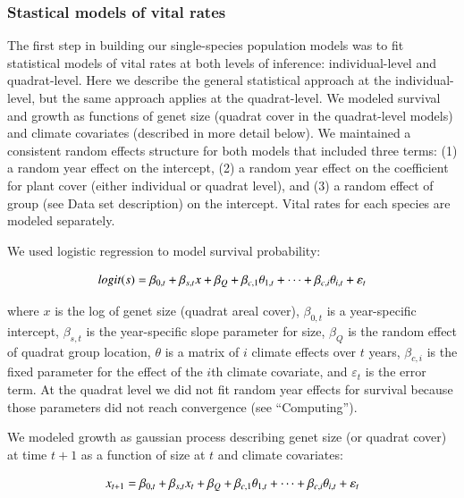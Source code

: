 \documentclass[author-year, 12pt,review]{components/elsarticle} %
\begin{document}
\subsubsection{Stastical models of vital
rates}\label{stastical-models-of-vital-rates}

The first step in building our single-species population models was to
fit statistical models of vital rates at both levels of inference:
individual-level and quadrat-level. Here we describe the general
statistical approach at the individual-level, but the same approach
applies at the quadrat-level. We modeled survival and growth as
functions of genet size (quadrat cover in the quadrat-level models) and
climate covariates (described in more detail below). We maintained a
consistent random effects structure for both models that included three
terms: (1) a random year effect on the intercept, (2) a random year
effect on the coefficient for plant cover (either individual or quadrat
level), and (3) a random effect of group (see Data set description) on
the intercept. Vital rates for each species are modeled separately.

We used logistic regression to model survival probability:

\begin{equation}
logit(s) = \beta_{0,t} + \beta_{s,t}x + \beta_{Q} + \beta_{c,1}\theta_{1,t}\\
+ \cdots +  \beta_{c,i}\theta_{i,t} + \varepsilon_{t}
\end{equation}

where $x$ is the log of genet size (quadrat areal cover), $\beta_{0,t}$
is a year-specific intercept, $\beta_{s,t}$ is the year-specific slope
parameter for size, $\beta_{Q}$ is the random effect of quadrat group
location, $\theta$ is a matrix of $i$ climate effects over $t$ years,
$\beta_{c,i}$ is the fixed parameter for the effect of the $i$th climate
covariate, and $\varepsilon_{t}$ is the error term. At the quadrat level
we did not fit random year effects for survival because those parameters
did not reach convergence (see ``Computing'').

We modeled growth as gaussian process describing genet size (or quadrat
cover) at time $t+1$ as a function of size at $t$ and climate
covariates:

\begin{equation}
x_{t+1} = \beta_{0,t} + \beta_{s,t}x_{t} + \beta_{Q} + \beta_{c,1}\theta_{1,t}\\
+ \cdots +  \beta_{c,i}\theta_{i,t} + \varepsilon_{t}
\end{equation}
\end{document}
